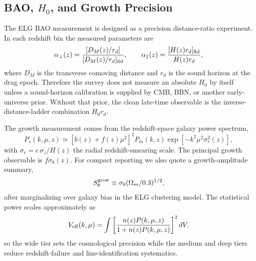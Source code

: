 \documentclass[10pt,onecolumn]{article}
\newcommand{\fsig}{f\sigma_8}
\begin{document}
\subsection{BAO, \texorpdfstring{$H_0$}{H0}, and Growth Precision}

The ELG BAO measurement is designed as a precision distance-ratio experiment. In each redshift bin the measured parameters are
\begin{equation}
  \alpha_\perp(z)=
  \frac{[D_M(z)/r_d]}{[D_M(z)/r_d]_{\rm fid}},\qquad
  \alpha_\parallel(z)=
  \frac{[H(z)r_d]_{\rm fid}}{H(z)r_d},
\end{equation}
where $D_M$ is the transverse comoving distance and $r_d$ is the sound horizon at the drag epoch. Therefore the survey does not measure an absolute $H_0$ by itself unless a sound-horizon calibration is supplied by CMB, BBN, or another early-universe prior. Without that prior, the clean late-time observable is the inverse-distance-ladder combination $H_0r_d$.

The growth measurement comes from the redshift-space galaxy power spectrum,
\begin{equation}
  P_s(k,\mu,z)\simeq
  \left[b(z)+f(z)\mu^2\right]^2 P_m(k,z)
  \exp\!\left[-k^2\mu^2\sigma_r^2(z)\right],
\end{equation}
with $\sigma_r=c\,\sigma_z/H(z)$ the radial redshift-smearing scale. The principal growth observable is $\fsig(z)$. For compact reporting we also quote a growth-amplitude summary,
\begin{equation}
  S_8^{\rm grow}\equiv \sigma_8(\Omega_m/0.3)^{1/2},
\end{equation}
after marginalizing over galaxy bias in the ELG clustering model. The statistical power scales approximately as
\begin{equation}
  V_{\rm eff}(k,\mu)=
  \int \left[\frac{n(z)P(k,\mu,z)}{1+n(z)P(k,\mu,z)}\right]^2 dV,
\end{equation}
so the wide tier sets the cosmological precision while the medium and deep tiers reduce redshift-failure and line-identification systematics.
\end{document}
